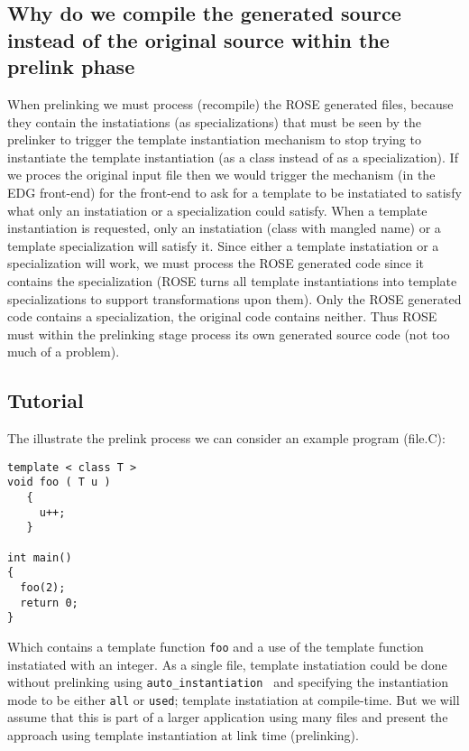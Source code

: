 {\subsection{Why do we compile the generated source instead of the original source within the prelink phase}
   When prelinking we must process (recompile) the ROSE generated files, because they 
contain the instatiations (as specializations) that must be seen by the prelinker to 
trigger the template instantiation mechanism to stop trying to instantiate the template
instantiation (as a class instead of as a specialization).  If we proces the original input file
then we would trigger the mechanism (in the EDG front-end) for the front-end to ask for a template to be
instatiated to satisfy what only an instatiation or a specialization could satisfy.
When a template instantiation is requested, only an instatiation (class with mangled name)
or a template specialization will satisfy it. 
Since either a template instatiation or a specialization will work, we must process
the ROSE generated code since it contains the specialization (ROSE turns all template
instantiations into template specializations to support transformations upon them).
Only the ROSE generated code contains a specialization, the original code contains 
neither.  Thus ROSE must within the prelinking stage process its own generated 
source code (not too much of a problem).

\subsection{Tutorial}

   The illustrate the prelink process we can consider an example program (file.C):

{\indent
{\mySmallFontSize

\begin{verbatim}
template < class T >
void foo ( T u )
   {
     u++;
   }

int main()
{
  foo(2);
  return 0;
}
\end{verbatim}
}}

Which contains a template function {\tt foo} and a use of the template function
instatiated with an integer. As a single file, template instatiation could be done
without prelinking using {\tt auto\_instantiation } and specifying the instantiation
mode to be either {\tt all} or {\tt used}; template instatiation at compile-time.  
But we will assume that this is part of a larger application using many files and 
present the approach using template instantiation at link time (prelinking).


}
